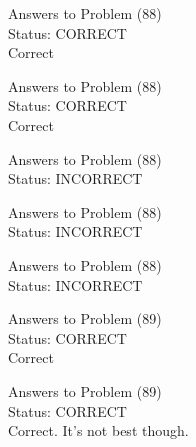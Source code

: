 \documentclass[11pt]{article}
\begin{document}
\begin{minipage}[t]{0.5\textwidth}
  {\centering
  
  Answers to Problem (88)\\
  Status: CORRECT\\
  Correct\\
  }
\end{minipage}
\begin{minipage}[t]{0.5\textwidth}
  {\centering
  
  Answers to Problem (88)\\
  Status: CORRECT\\
  Correct\\
  }
\end{minipage}
\begin{minipage}[t]{0.5\textwidth}
  {\centering
  
  Answers to Problem (88)\\
  Status: INCORRECT\\
  
  }
\end{minipage}
\begin{minipage}[t]{0.5\textwidth}
  {\centering
  
  Answers to Problem (88)\\
  Status: INCORRECT\\
  
  }
\end{minipage}
\begin{minipage}[t]{0.5\textwidth}
  {\centering
  
  Answers to Problem (88)\\
  Status: INCORRECT\\
  
  }
\end{minipage}
\begin{minipage}[t]{0.5\textwidth}
  {\centering
  
  Answers to Problem (89)\\
  Status: CORRECT\\
  Correct\\
  }
\end{minipage}
\begin{minipage}[t]{0.5\textwidth}
  {\centering
  
  Answers to Problem (89)\\
  Status: CORRECT\\
  Correct. It's not best though.\\
  }
\end{minipage}
\end{document}
